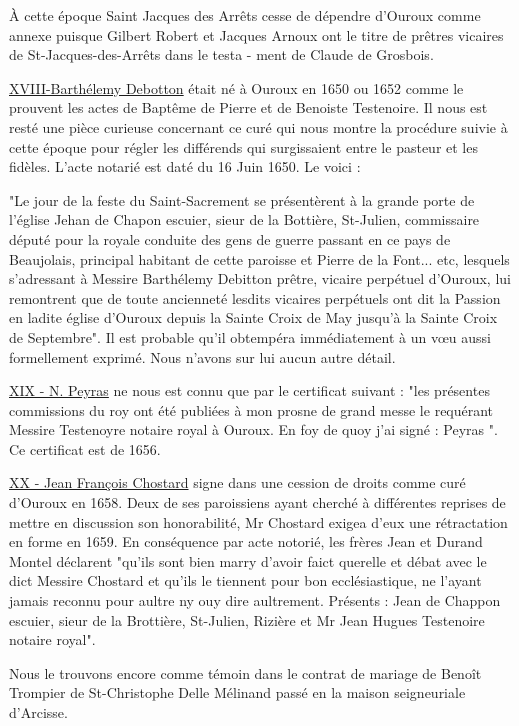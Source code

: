 À cette époque Saint Jacques des Arrêts cesse de dépendre d'Ouroux
comme annexe puisque Gilbert Robert et Jacques Arnoux ont le
titre de prêtres vicaires de St-Jacques-des-Arrêts dans le testa -
ment de Claude de Grosbois.

\underline{XVIII-Barthélemy Debotton} était né à Ouroux en 1650 ou 1652 comme
le prouvent les actes de Baptême de Pierre et de Benoiste Testenoire.
Il nous est resté une pièce curieuse concernant ce curé qui
nous montre la procédure suivie à cette époque pour régler les différends
qui surgissaient entre le pasteur et les fidèles. L'acte
notarié est daté du 16 Juin 1650. Le voici :

"Le jour de la feste du Saint-Sacrement se présentèrent à la
grande porte de l'église Jehan de Chapon escuier, sieur de la Bottière,
St-Julien, commissaire député pour la royale conduite des gens
de guerre passant en ce pays de Beaujolais, principal habitant de
cette paroisse et Pierre de la Font... etc, lesquels s'adressant à
Messire Barthélemy Debitton prêtre, vicaire perpétuel d'Ouroux, lui
remontrent que de toute ancienneté lesdits vicaires perpétuels ont
dit la Passion en ladite église d'Ouroux depuis la Sainte Croix de
May jusqu'à la Sainte Croix de Septembre". Il est probable qu'il
obtempéra immédiatement à un vœu aussi formellement exprimé. Nous
n'avons sur lui aucun autre détail.

\underline{XIX - N. Peyras} ne nous est connu que par le certificat suivant : "les présentes commissions du roy ont été publiées à mon prosne de grand messe le requérant Messire Testenoyre notaire royal à Ouroux. En foy de quoy j'ai signé : Peyras ". Ce certificat est de 1656.

\underline{XX - Jean François Chostard} signe dans une cession de droits comme curé d'Ouroux en 1658. Deux de ses paroissiens ayant cherché à différentes reprises de mettre en discussion son honorabilité, Mr Chostard exigea d'eux une rétractation en forme en 1659. En conséquence par acte notorié, les frères Jean et Durand Montel déclarent "qu'ils sont bien marry d'avoir faict querelle et débat avec le dict Messire Chostard et qu'ils le tiennent pour bon ecclésiastique, ne l'ayant jamais reconnu pour aultre ny ouy dire aultrement. Présents : Jean de Chappon escuier, sieur de la Brottière, St-Julien, Rizière et Mr Jean Hugues Testenoire notaire royal".

Nous le trouvons encore comme témoin dans le contrat de mariage de Benoît Trompier de St-Christophe Delle Mélinand passé en la maison seigneuriale d'Arcisse.


